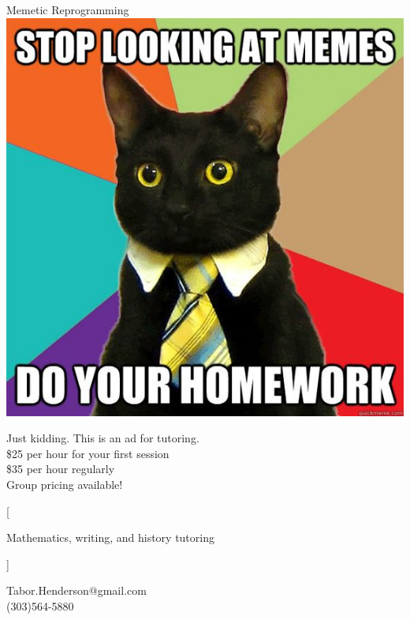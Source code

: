 \documentclass[letterpaper]{article}
\begin{document}
\thispagestyle{empty} \pagestyle{empty}
\begin{center}
\Huge Memetic Reprogramming\\

\includegraphics[width=\textwidth]{hwmeme.jpg}

\normalsize  Just kidding. This is an ad for tutoring. \\ 
\$25 per hour for your first session \\
\$35 per hour regularly \\
Group pricing available!
\end{center}
\stubs[15]{6cm}[{\raggedright Mathematics, writing, and history tutoring}]%
  {\raggedright Tabor.Henderson@gmail.com \\ (303)564-5880}
\end{document}
